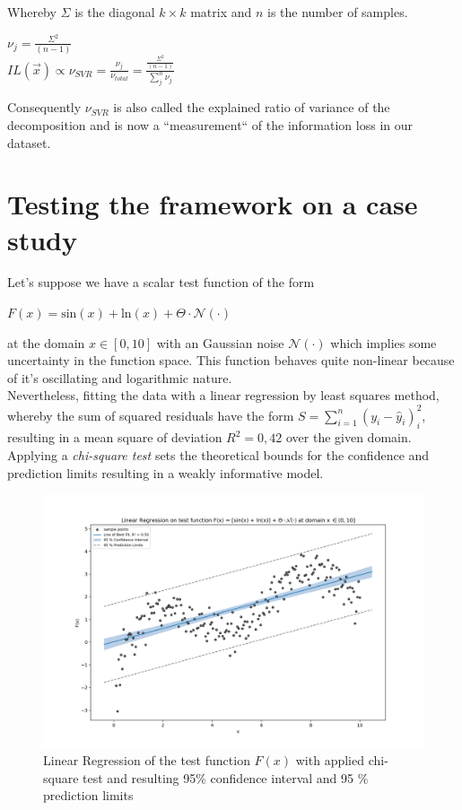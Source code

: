 \documentclass[12pt, a4paper]{article}
\begin{document}
Whereby $\Sigma$ is the diagonal $k \times k$ matrix and $n$ is the number of samples.
\begin{center}
    $\nu_{j} = \frac{\Sigma^2}{(n - 1)}$ \\
    $IL(\vec{x}) \propto \nu_{SVR} = \frac{\nu_{j}}{\nu_{total}} = \frac{\frac{\Sigma^2}{(n - 1)}}{\sum_j^n \nu_j}$ 
\end{center}
Consequently $\nu_{SVR}$ is also called the explained ratio of variance of the decomposition and is now a ``measurement`` of the information loss in our dataset.
\newpage
\section{Testing the framework on a case study}
Let's suppose we have a scalar test function of the form 
\begin{center}
    $F(x) = \text{sin}(x) + \text{ln}(x) + \Theta \cdot \mathcal{N}(\cdot)$
\end{center}
at the domain $x \in [0, 10]$ with an Gaussian noise $\mathcal{N}(\cdot)$ which implies some uncertainty in the function space. This function behaves quite non-linear because of it's oscillating and logarithmic nature. \\
Nevertheless, fitting the data with a linear regression by least squares method, whereby the sum of squared residuals have the form $S = \sum_{i=1}^{n} (y_i - \hat{y}_i)^2_i$, resulting in a mean square of deviation $R^2 = 0,42$ over the given domain. Applying a \textit{chi-square test} sets the theoretical bounds for the confidence and prediction limits resulting in a weakly informative model.
\begin{figure}[!htpb]
    \centering
    \includegraphics[width=1\textwidth,trim={0 0 0 0},clip]{figures/linear_regression.png}
    \caption[Linear Regression of the test function]{Linear Regression of the test function $F(x)$ with applied chi-square test and resulting 95\% confidence interval and 95 \% prediction limits}
    \label{fig: linear_regression_testfunction}    
\end{figure}
\end{document}

